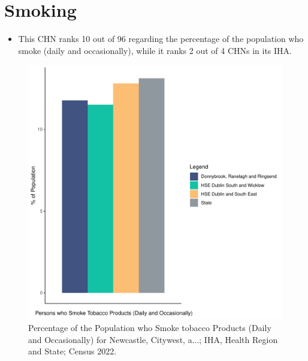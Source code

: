 \documentclass{article}
\begin{document}
\pagebreak

\section{Smoking}\label{sect:Smoking}
\begin{itemize}
\item This CHN ranks  10 out of 96 regarding the percentage of the population who smoke (daily and occasionally), while it ranks   2 out of 4 CHNs in its IHA.
\end{itemize}
\begin{figure}[H]
	\centering
	\includegraphics[width = 120mm]{../figures/SmokingED.pdf}
	\caption{Percentage of the Population who Smoke tobacco Products (Daily and Occasionally) for Newcastle, Citywest, a...; IHA, Health Region and State; Census 2022.}
	\label{fig:2ae19629-1a6a-13a3-e055-000000000001}
	\end{figure}
	
\end{document}
